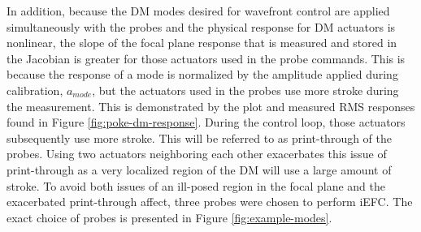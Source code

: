 \documentclass[12pt]{spieman}  %
\begin{document}
\begin{spacing}{2}
In addition, because the DM modes desired for wavefront control are applied simultaneously with the probes and the physical response for DM actuators is nonlinear, the slope of the focal plane response that is measured and stored in the Jacobian is greater for those actuators used in the probe commands. This is because the response of a mode is normalized by the amplitude applied during calibration, $a_{mode}$, but the actuators used in the probes use more stroke during the measurement. This is demonstrated by the plot and measured RMS responses found in Figure \ref{fig:poke-dm-response}. During the control loop, those actuators subsequently use more stroke. This will be referred to as print-through of the probes. Using two actuators neighboring each other exacerbates this issue of print-through as a very localized region of the DM will use a large amount of stroke. To avoid both issues of an ill-posed region in the focal plane and the exacerbated print-through affect, three probes were chosen to perform iEFC. The exact choice of probes is presented in Figure \ref{fig:example-modes}.


\end{spacing}
\end{document}
